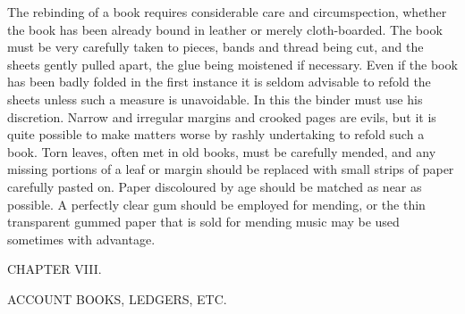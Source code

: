 \documentclass[twoside]{book}
\begin{document}
The rebinding of a book requires considerable
care and circumspection, whether the book has been
already bound in leather or merely cloth-boarded.
The book must be very carefully taken to pieces,
bands and thread being cut, and the sheets gently
pulled apart, the glue being moistened if necessary.
Even if the book has been badly folded in the first
instance it is seldom advisable to refold the sheets
unless such a measure is unavoidable. In this the
binder must use his discretion. Narrow and
irregular margins and crooked pages are evils, but
it is quite possible to make matters worse by rashly
undertaking to refold such a book. Torn leaves,
often met in old books, must be carefully mended,
and any missing portions of a leaf or margin should
be replaced with small strips of paper carefully
pasted on. Paper discoloured by age should be
matched as near as possible. A perfectly clear
gum should be employed for mending, or the thin
transparent gummed paper that is sold for mending
music may be used sometimes with advantage.

\pagebreak


\vspace*{\fill}

\begin{center}

\begin{large}CHAPTER VIII.\end{large}

\begin{small}ACCOUNT BOOKS, LEDGERS, ETC.\end{small}

\end{center}
\end{document}
